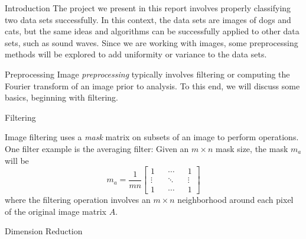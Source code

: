 \begin{section}{Introduction}
The project we present in this report involves properly classifying two data sets successfully. In this context, the data sets are images of dogs and cats, but the same ideas and algorithms can be successfully applied to other data sets, such as sound waves. Since we are working with images, some preprocessing methods will be explored to add uniformity or variance to the data sets. 
\end{section}

\begin{section}{Preprocessing}
Image \textit{preprocessing} typically involves filtering or computing the Fourier transform of an image prior to analysis. To this end, we will discuss some basics, beginning with filtering. 

\begin{subsection}{Filtering}

Image filtering uses a \textit{mask} matrix on subsets of an image to perform operations. One filter example is the averaging filter: Given an $m \times n$ mask size, the mask $m_a$will be
$$
	m_a = \frac{1}{mn} \begin{bmatrix} 1 && \cdots && 1 \\ \vdots && \ddots && \vdots \\ 1 && \cdots && 1 \end{bmatrix}
$$
where the filtering operation involves an $m \times n$ neighborhood around each pixel of the original image matrix $A$.
\end{subsection}

\begin{subsection}{Dimension Reduction}
\end{subsection}

\end{section}

